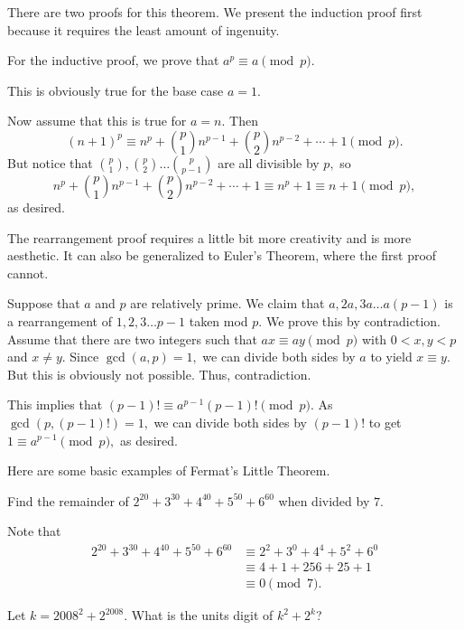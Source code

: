 \documentclass[mast]{lucky}
\begin{document}
There are two proofs for this theorem. We present the induction proof first because it requires the least amount of ingenuity.
\begin{pro}[1 (Induction)]
For the inductive proof, we prove that $a^p\equiv a\pmod{p}$.

This is obviously true for the base case $a=1.$

Now assume that this is true for $a=n.$ Then
\[(n+1)^p\equiv n^p+\binom{p}{1}n^{p-1}+\binom{p}{2}n^{p-2}+\cdots+1\pmod{p}.\]
But notice that $\binom{p}{1},\binom{p}{2}\dots\binom{p}{p-1}$ are all divisible by $p,$ so
\[n^p+\binom{p}{1}n^{p-1}+\binom{p}{2}n^{p-2}+\cdots+1\equiv n^p+1\equiv n+1 \pmod{p},\]
as desired.
\end{pro}
The rearrangement proof requires a little bit more creativity and is more aesthetic. It can also be generalized to Euler's Theorem, where the first proof cannot.
\begin{pro}[2 (Rearrangement)]
Suppose that $a$ and $p$ are relatively prime. We claim that $a,2a,3a\dots a(p-1)$ is a rearrangement of $1,2,3\dots p-1$ taken mod $p.$ We prove this by contradiction. Assume that there are two integers such that $ax\equiv ay \pmod{p}$ with $0 < x, y < p$ and $x \neq y$. Since $\gcd(a,p)=1,$ we can divide both sides by $a$ to yield $x\equiv y.$ But this is obviously not possible. Thus, contradiction.

This implies that $(p-1)!\equiv a^{p-1}(p-1)! \pmod{p}.$ As $\gcd(p,(p-1)!)=1,$ we can divide both sides by $(p-1)!$ to get $1\equiv a^{p-1}\pmod{p},$ as desired.
\end{pro}

Here are some basic examples of Fermat's Little Theorem.

\begin{exam}
Find the remainder of $2^{20} + 3^{30} + 4^{40} + 5^{50} + 6^{60}$ when divided by $7.$
\end{exam}

\begin{sol}
Note that
\begin{align*}
2^{20} + 3^{30} + 4^{40} + 5^{50} + 6^{60}&\equiv 2^2+3^0+4^4+5^2+6^0\\
&\equiv 4+1+256+25+1 \\
&\equiv 0\pmod{7}.
\end{align*}
\end{sol}

\begin{exam}[AMC 12A 2008/15]
Let $k={2008}^{2}+{2}^{2008}$. What is the units digit of $k^2+2^k$?
\end{exam}
\end{document}
